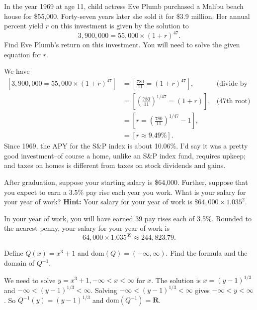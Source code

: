 \documentclass[12pt, answers,fleqn]{exam}
\newcommand{\reals}{\mathbf{R}}
\newcommand{\dom}{\mbox{dom}}
\begin{document}
\begin{questions}
\question  In the year 1969 at age 11, child actress Eve Plumb purchased a Malibu beach house for \$55,000. Forty-seven years
later she sold it for \$3.9 million. Her annual percent yield $r$ on this investment is given by the solution to
\[
       3, 900,000 = 55,000 \times (1 + r)^{47}.
\]
Find Eve Plumb's return on this investment. You will need to solve the given equation for $r$.
    \begin{solution}%
        We have
        \begin{align*}
            \left [3, 900,000 = 55,000 \times (1 + r)^{47} \right] &= 
           \left [\frac{780}{11} = (1 + r)^{47} \right] , &\mbox{(divide by 55000)}\\
            &= \left [\left(\frac{780}{11}\right)^{1/47} = (1 + r) \right] , &\mbox{(47th root)}\\
            &= \left [r = \left(\frac{780}{11} \right)^{1/47} - 1 \right], \\
            &= \left [r \approx 9.49\% \right ].
        \end{align*}
    Since 1969, the APY for the S\&P index is about 10.06\%. I'd
    say it was a pretty good investment--of course a home, unlike
    an S\&P index fund,  requires upkeep; and taxes on homes is different
    from taxes on stock dividends and gains.
    \end{solution}
    \question   After graduation, suppose your starting salary is \$64,000. Further, suppose
that you expect to earn a 3.5\% pay rise each year you work. What is your salary for 
your  year of work?  \textbf{Hint:} Your salary for your  year of work
is $\$64,000 \times 1.035^2$.
\begin{solution}%
In your  year of work, you will have earned 39 pay rises each of 3.5\%. Rounded to 
the nearest penny, your salary for your  year of work is
\begin{equation*}
   64,000 \times 1.035^{39} \approx 244,823.79.
 \end{equation*}   
\end{solution}

\question   Define $Q(x) = x^3 + 1$ and $\dom(Q) = (-\infty,\infty)$. Find the formula
and the domain of $Q^{-1}$. 
\begin{solution} 
    We need to solve $y = x^3+1, -\infty < x < \infty $ for $x$. The
    solution is \mbox{$x = (y-1)^{1/3}$} and $ -\infty < (y-1)^{1/3} < \infty $. 
    Solving $-\infty < (y-1)^{1/3} < \infty$ gives $ -\infty < y < \infty$.
    So  $Q^{-1}(y) = (y-1)^{1/3}$ and $\dom(Q^{-1}) = \reals$.


\end{solution}
\end{questions}
\end{document}
